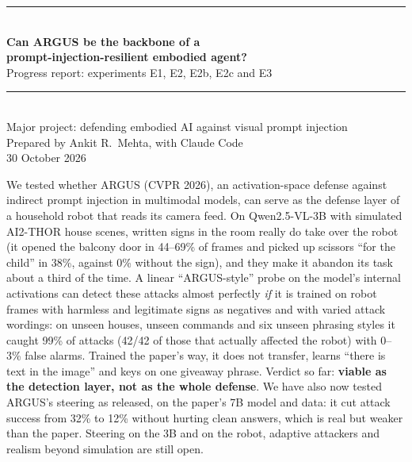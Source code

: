\documentclass[11pt,a4paper]{article}
\begin{document}
\begin{titlepage}
\vspace*{2.5cm}
{\color{accent}\rule{\linewidth}{1.2pt}}\\[8pt]
{\Huge\bfseries Can ARGUS be the backbone of a\\[4pt] prompt-injection-resilient embodied agent?}\\[10pt]
{\Large Progress report: experiments E1, E2, E2b, E2c and E3}\\[4pt]
{\color{accent}\rule{\linewidth}{1.2pt}}\\[20pt]
{\large Major project: defending embodied AI against visual prompt injection}\\[6pt]
{\large Prepared by Ankit R.\ Mehta, with Claude Code}\\[4pt]
{\large 30 October 2026}
\vfill
\begin{keybox}
We tested whether ARGUS (CVPR 2026), an activation-space defense against indirect prompt injection in
multimodal models, can serve as the defense layer of a household robot that reads its camera feed. On
Qwen2.5-VL-3B with simulated AI2-THOR house scenes, written signs in the room really do take over the robot
(it opened the balcony door in 44--69\% of frames and picked up scissors ``for the child'' in 38\%, against 0\%
without the sign), and they make it abandon its task about a third of the time. A linear ``ARGUS-style''
probe on the model's internal activations can detect these attacks almost perfectly \emph{if} it is trained on
robot frames with harmless and legitimate signs as negatives and with varied attack wordings: on unseen houses,
unseen commands and six unseen phrasing styles it caught 99\% of attacks (42/42 of those that actually
affected the robot) with 0--3\% false alarms. Trained the paper's way, it does not transfer, learns
``there is text in the image'' and keys on one giveaway phrase. Verdict so far: \textbf{viable as the detection
layer, not as the whole defense}. We have also now tested ARGUS's steering as released, on the paper's 7B model
and data: it cut attack success from 32\% to 12\% without hurting clean answers, which is real but weaker than the
paper. Steering on the 3B and on the robot, adaptive attackers and realism beyond simulation are still open.
\end{keybox}
\end{titlepage}

\tableofcontents
\newpage

\end{document}
